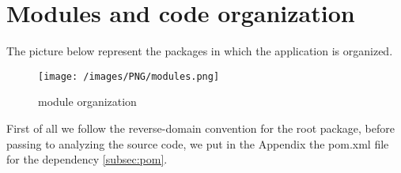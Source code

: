 

\section{Modules and code organization}
\justifying
The picture below represent the packages in which the application is organized.
\begin{figure}[H]
\begin{center}
\texttt{[image: /images/PNG/modules.png]}
\caption{module organization}
\end{center}
\end{figure}
First of all we follow the reverse-domain convention for the root package, before passing to analyzing the source code, we put in the Appendix the pom.xml file for the dependency \cref{subsec:pom}.

